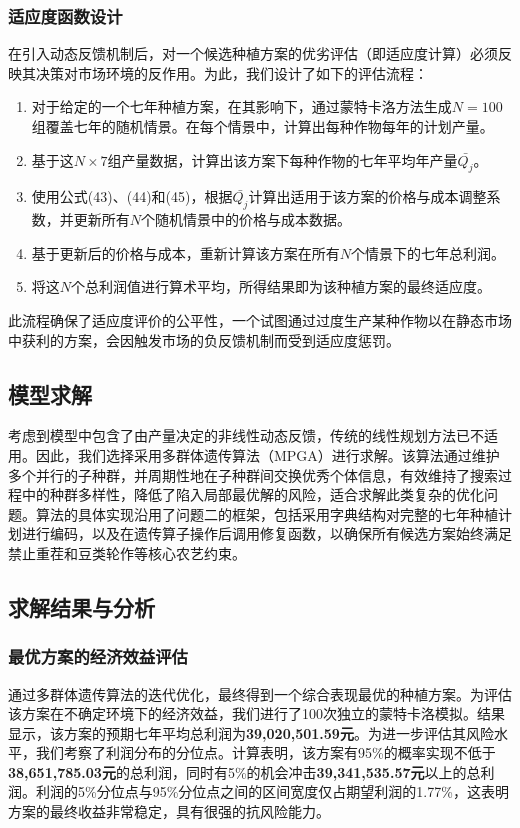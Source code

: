 \subsubsection{适应度函数设计}
在引入动态反馈机制后，对一个候选种植方案的优劣评估（即适应度计算）必须反映其决策对市场环境的反作用。为此，我们设计了如下的评估流程：
\begin{enumerate}
    \item 对于给定的一个七年种植方案，在其影响下，通过蒙特卡洛方法生成$N=100$组覆盖七年的随机情景。在每个情景中，计算出每种作物每年的计划产量。
    \item 基于这$N \times 7$组产量数据，计算出该方案下每种作物的七年平均年产量$\bar{Q_j}$。
    \item 使用公式(43)、(44)和(45)，根据$\bar{Q_j}$计算出适用于该方案的价格与成本调整系数，并更新所有$N$个随机情景中的价格与成本数据。
    \item 基于更新后的价格与成本，重新计算该方案在所有$N$个情景下的七年总利润。
    \item 将这$N$个总利润值进行算术平均，所得结果即为该种植方案的最终适应度。
\end{enumerate}
此流程确保了适应度评价的公平性，一个试图通过过度生产某种作物以在静态市场中获利的方案，会因触发市场的负反馈机制而受到适应度惩罚。

\subsection{模型求解}
考虑到模型中包含了由产量决定的非线性动态反馈，传统的线性规划方法已不适用。因此，我们选择采用多群体遗传算法（MPGA）进行求解。该算法通过维护多个并行的子种群，并周期性地在子种群间交换优秀个体信息，有效维持了搜索过程中的种群多样性，降低了陷入局部最优解的风险，适合求解此类复杂的优化问题。算法的具体实现沿用了问题二的框架，包括采用字典结构对完整的七年种植计划进行编码，以及在遗传算子操作后调用修复函数，以确保所有候选方案始终满足禁止重茬和豆类轮作等核心农艺约束。

\subsection{求解结果与分析}

\subsubsection{最优方案的经济效益评估}
通过多群体遗传算法的迭代优化，最终得到一个综合表现最优的种植方案。为评估该方案在不确定环境下的经济效益，我们进行了100次独立的蒙特卡洛模拟。结果显示，该方案的预期七年平均总利润为\textbf{39,020,501.59元}。为进一步评估其风险水平，我们考察了利润分布的分位点。计算表明，该方案有95\%的概率实现不低于\textbf{38,651,785.03元}的总利润，同时有5\%的机会冲击\textbf{39,341,535.57元}以上的总利润。利润的5\%分位点与95\%分位点之间的区间宽度仅占期望利润的1.77\%，这表明方案的最终收益非常稳定，具有很强的抗风险能力。

